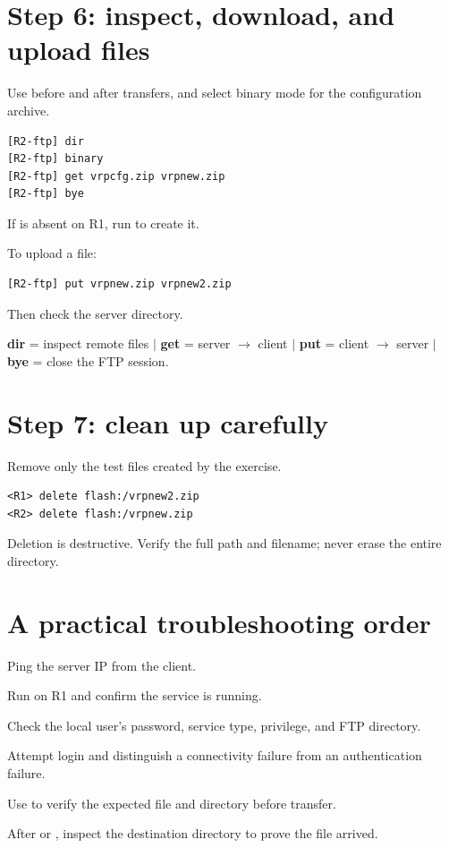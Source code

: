 \section{Step 6: inspect, download, and upload files}
Use  before and after transfers, and select binary mode for the configuration archive.
\begin{lstlisting}[style=utpterminal]
[R2-ftp] dir
[R2-ftp] binary
[R2-ftp] get vrpcfg.zip vrpnew.zip
[R2-ftp] bye
\end{lstlisting}
If  is absent on R1, run  to create it.

To upload a file:
\begin{lstlisting}[style=utpterminal]
[R2-ftp] put vrpnew.zip vrpnew2.zip
\end{lstlisting}
Then check the server directory.

\begin{conceptmap}
\textbf{dir} = inspect remote files \quad $\vert$ \quad
\textbf{get} = server $\rightarrow$ client \quad $\vert$ \quad
\textbf{put} = client $\rightarrow$ server \quad $\vert$ \quad
\textbf{bye} = close the FTP session.
\end{conceptmap}

\section{Step 7: clean up carefully}
Remove only the test files created by the exercise.
\begin{lstlisting}[style=utpterminal]
<R1> delete flash:/vrpnew2.zip
<R2> delete flash:/vrpnew.zip
\end{lstlisting}

\begin{pitfall}
Deletion is destructive. Verify the full path and filename; never erase the entire  directory.
\end{pitfall}

\section{A practical troubleshooting order}
\begin{utpsteps}
\item Ping the server IP from the client.
\item Run  on R1 and confirm the service is running.
\item Check the local user's password, service type, privilege, and FTP directory.
\item Attempt login and distinguish a connectivity failure from an authentication failure.
\item Use  to verify the expected file and directory before transfer.
\item After  or , inspect the destination directory to prove the file arrived.
\end{utpsteps}


